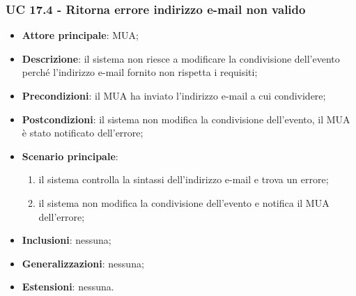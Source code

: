     \subsubsection{UC 17.4 - Ritorna errore indirizzo e-mail non valido} \label{sec:UC17.4}
    \begin{itemize}
        \item \textbf{Attore principale}: MUA;
        \item \textbf{Descrizione}: il sistema non riesce a modificare la condivisione dell'evento perché l'indirizzo e-mail fornito non rispetta i requisiti;
        \item \textbf{Precondizioni}: il MUA ha inviato l'indirizzo e-mail a cui condividere;
        \item \textbf{Postcondizioni}: il sistema non modifica la condivisione dell'evento, il MUA è stato notificato dell'errore;
        \item \textbf{Scenario principale}:
            \begin{enumerate}
                \item il sistema controlla la sintassi dell'indirizzo e-mail e trova un errore;
                \item il sistema non modifica la condivisione dell'evento e notifica il MUA dell'errore;
            \end{enumerate}
        \item \textbf{Inclusioni}: nessuna;
        \item \textbf{Generalizzazioni}: nessuna;
        \item \textbf{Estensioni}: nessuna.
    \end{itemize}
